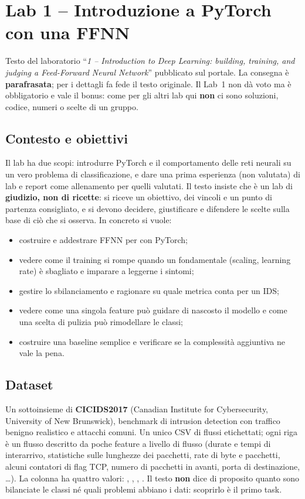 \chapter{Lab 1 -- Introduzione a PyTorch con una FFNN}
\label{cap:lab1}

\begin{nota}
Testo del laboratorio ``\emph{1 -- Introduction to Deep Learning: building, training, and judging a
Feed-Forward Neural Network}'' pubblicato sul portale. La consegna è \textbf{parafrasata}; per i
dettagli fa fede il testo originale. Il Lab~1 non dà voto ma è obbligatorio e vale il bonus: come
per gli altri lab qui \textbf{non} ci sono soluzioni, codice, numeri o scelte di un gruppo.
\end{nota}

\section{Contesto e obiettivi}
Il lab ha due scopi: introdurre PyTorch e il comportamento delle reti neurali su un vero problema
di classificazione, e dare una prima esperienza (non valutata) di lab e report come allenamento per
quelli valutati. Il testo insiste che è un lab di \textbf{giudizio, non di ricette}: si riceve un
obiettivo, dei vincoli e un punto di partenza consigliato, e si devono decidere, giustificare e
difendere le scelte sulla base di ciò che si osserva. In concreto si vuole:
\begin{itemize}
  \item costruire e addestrare FFNN per  con PyTorch;
  \item vedere come il training si rompe quando un fondamentale (scaling, learning rate) è sbagliato
        e imparare a leggerne i sintomi;
  \item gestire lo sbilanciamento e ragionare su quale metrica conta per un IDS;
  \item vedere come una singola feature può guidare di nascosto il modello e come una scelta di
        pulizia può rimodellare le classi;
  \item costruire una baseline semplice e verificare se la complessità aggiuntiva ne vale la pena.
\end{itemize}

\section{Dataset}
Un sottoinsieme di \textbf{CICIDS2017} (Canadian Institute for Cybersecurity, University of New
Brunswick), benchmark di intrusion detection con traffico benigno realistico e attacchi comuni. Un
unico CSV di flussi etichettati; ogni riga è un flusso descritto da poche feature a livello di flusso
(durate e tempi di interarrivo, statistiche sulle lunghezze dei pacchetti, rate di byte e pacchetti,
alcuni contatori di flag TCP, numero di pacchetti in avanti, porta di destinazione, \ldots). La colonna
 ha quattro valori: , , , .
Il testo \textbf{non} dice di proposito quanto sono bilanciate le classi né quali problemi abbiano i
dati: scoprirlo è il primo task.

